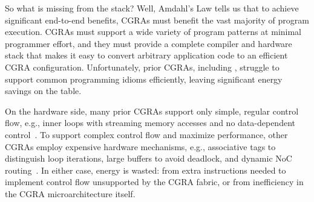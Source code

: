 


%
So what is missing from the stack?
% 
Well, Amdahl's Law tells us that to achieve significant end-to-end benefits,
CGRAs must benefit the vast majority of program execution.
%
CGRAs must support a wide variety of program patterns at minimal programmer effort,
% 
and they must provide a complete compiler and hardware stack that makes it easy to convert arbitrary application code to an efficient CGRA configuration.
%
Unfortunately, prior CGRAs, including \snafu, struggle to support common programming
idioms efficiently, leaving significant energy savings on the table.

On the hardware side,
%
many prior CGRAs support only simple, regular control flow,
e.g., inner loops with streaming memory accesses
and no data-dependent control~\cite{plasticine,nowatzki:isca17:stream-dataflow,snafu}.
%
To support complex control flow and maximize performance, other CGRAs employ expensive hardware mechanisms, e.g.,
associative tags to distinguish loop iterations,
large buffers to avoid deadlock,
and dynamic NoC routing~\cite{monsoon,ttda,swanson2003wavescalar,voitsechov2014single}.
%
%
In either case, energy is wasted:
%
from extra instructions needed to implement control flow unsupported
by the CGRA fabric,
%
or from inefficiency in the CGRA microarchitecture itself.


